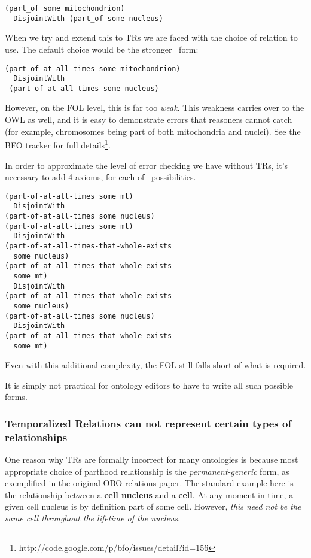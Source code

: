 \documentclass{bioinfo}
\def\atAllTimes{\pr{at-all-times}}
\begin{document}
\begin{verbatim}
(part_of some mitochondrion) 
  DisjointWith (part_of some nucleus)
\end{verbatim}

When we try and extend this to TRs we are faced with the choice of
relation to use. The default choice would be the stronger \atAllTimes\
form:

\begin{verbatim}
(part-of-at-all-times some mitochondrion) 
  DisjointWith
 (part-of-at-all-times some nucleus)
\end{verbatim}

However, on the FOL level, this is far too \emph{weak}. This weakness
carries over to the OWL as well, and it is easy to demonstrate errors
that reasoners cannot catch (for example, chromosomes being part of
both mitochondria and nuclei). See the BFO tracker for
full details\footnote{http://code.google.com/p/bfo/issues/detail?id=156}.

In order to approximate the level of error checking we have without
TRs, it's necessary to add 4 axioms, for each of \atAllTimes\
possibilities.

\begin{verbatim}
(part-of-at-all-times some mt)
  DisjointWith
(part-of-at-all-times some nucleus)
(part-of-at-all-times some mt)
  DisjointWith
(part-of-at-all-times-that-whole-exists
  some nucleus)
(part-of-at-all-times that whole exists
  some mt)
  DisjointWith 
(part-of-at-all-times-that-whole-exists
  some nucleus)
(part-of-at-all-times some nucleus)
  DisjointWith
(part-of-at-all-times-that-whole exists
  some mt)
\end{verbatim}

Even with this additional complexity, the FOL still falls short of
what is required.

It is simply not practical for ontology editors to have to write all
such possible forms.

\subsubsection{Temporalized Relations can not represent certain types
  of relationships}

One reason why TRs are formally incorrect for many ontologies is
because most appropriate choice of parthood relationship is the
\emph{permanent-generic} form, as exemplified in the original OBO
relations paper. The standard example here is the relationship between
a \textbf{cell nucleus} and a \textbf{cell}. At any moment in time, a
given cell nucleus is by definition part of some cell. However,
\emph{this need not be the same cell throughout the lifetime of the
  nucleus}.
\end{document}
